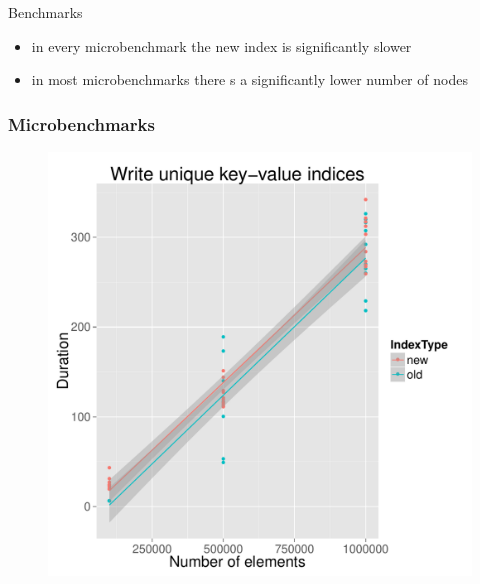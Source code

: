 \documentclass{beamer}
\begin{document}
\begin{section}{Benchmarks}
\begin{frame}
\begin{figure}
      \end{figure}
      \pause
        \begin{itemize}
          \item in every microbenchmark the new index is significantly slower
          \item in most microbenchmarks there s a significantly lower number of nodes
        \end{itemize}
    \end{frame}

    \begin{frame}
      \frametitle{Microbenchmarks}
      \begin{figure}
        \includegraphics[scale=0.3]{images/nonUnique_random_write.pdf}
      \end{figure}
    \end{frame}


\end{section}
\end{document}
